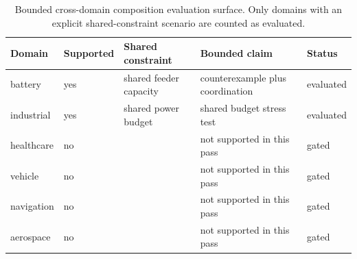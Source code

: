 \begin{table}[htbp]
\centering
\caption{Bounded cross-domain composition evaluation surface. Only domains with an explicit shared-constraint scenario are counted as evaluated.}
\label{tab:paper5-cross-domain}
\begin{tabular}{p{1.7cm}p{1.4cm}p{3.4cm}p{3.6cm}p{1.3cm}}
\toprule
\textbf{Domain} & \textbf{Supported} & \textbf{Shared constraint} & \textbf{Bounded claim} & \textbf{Status} \\
\midrule
battery & yes & shared feeder capacity & counterexample plus coordination & evaluated \\
industrial & yes & shared power budget & shared budget stress test & evaluated \\
healthcare & no &  & not supported in this pass & gated \\
vehicle & no &  & not supported in this pass & gated \\
navigation & no &  & not supported in this pass & gated \\
aerospace & no &  & not supported in this pass & gated \\
\bottomrule
\end{tabular}
\end{table}
